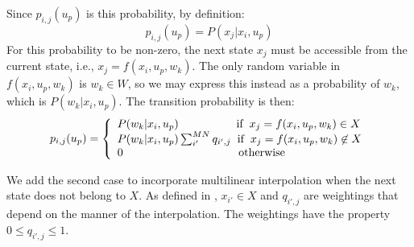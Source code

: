\documentclass[conference]{IEEEtran}
\begin{document}
Since $p_{i,j}(u_{p})$ is this probability, by definition: 
\begin{displaymath}
p_{i,j}(u_{p})= P(x_{j}| x_{i},u_{p})
\end{displaymath} For this probability to be non-zero, the next state $x_{j}$ must be accessible from the current state, i.e., $x_{j}=f(x_{i},u_{p},w_{k})$. %
The only random variable in $f(x_{i},u_{p},w_{k})$ is $w_{k}\in W$, so we may express this instead as a probability of $w_{k}$, which is $P(w_{k} | x_{i},u_{p})$. The transition probability is then:
\begin{equation} \label{eq:TransMtx}
p_{i,j}(u_{p})=
\left\{
\begin{array}{l}
P(w_{k}|x_{i},u_{p}) \hspace{1.8cm} \text{if} \hspace{0.2cm} x_{j}=f(x_{i},u_{p},w_{k})\in X\\
P(w_{k}|x_{i},u_{p})\sum_{i'}^{MN}q_{i',j} \hspace{0.2cm} \text{if} \hspace{0.2cm} x_{j}=f(x_{i},u_{p},w_{k})\not\in X\\
0 \hspace{3.6cm} \text{otherwise}
\end{array}
\right.
\end{equation}

We add the second case to incorporate multilinear interpolation when the next state does not belong to $X$. As defined in \cite{715376}, $x_{i'}\in X$ and $q_{i',j}$ are weightings that depend on the manner of the interpolation. The weightings have the property $0\leq q_{i',j}\leq 1$.
\end{document}
